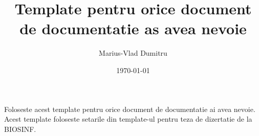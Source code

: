 \documentclass[12pt, a4paper, twoside, romanian]{teza-upb}
\author{Marius-Vlad Dumitru}
\date{\today}
\title{Template pentru orice document de documentatie as avea nevoie}
\begin{document}
    \maketitle

    Foloseste acest template pentru orice document de documentatie ai avea nevoie.
    Acest template foloseste setarile din template-ul pentru teza de dizertatie de la BIOSINF.
\end{document}
